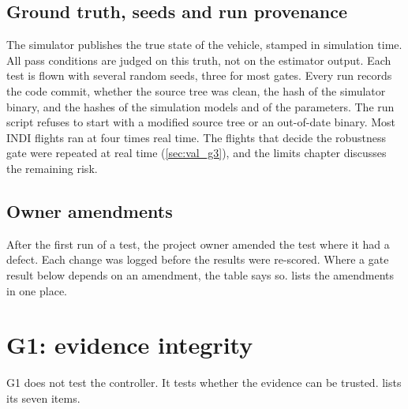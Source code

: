 \subsection{Ground truth, seeds and run provenance}\label{sec:val_truth}

The simulator publishes the true state of the vehicle, stamped in simulation time.
All pass conditions are judged on this truth, not on the estimator output.
Each test is flown with several random seeds, three for most gates.
Every run records the code commit, whether the source tree was clean, the hash of the simulator binary, and the hashes of the simulation models and of the parameters.
The run script refuses to start with a modified source tree or an out-of-date binary.
Most INDI flights ran at four times real time.
The flights that decide the robustness gate were repeated at real time (\cref{sec:val_g3}), and the limits chapter discusses the remaining risk.

\subsection{Owner amendments}\label{sec:val_amend}

After the first run of a test, the project owner amended the test where it had a defect.
Each change was logged before the results were re-scored.
Where a gate result below depends on an amendment, the table says so.
 lists the amendments in one place.

\section{G1: evidence integrity}\label{sec:val_g1}

G1 does not test the controller.
It tests whether the evidence can be trusted.
 lists its seven items.

